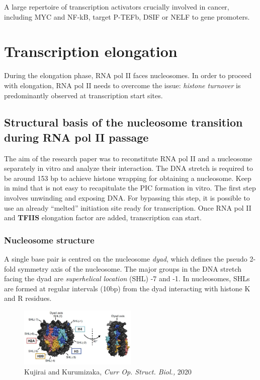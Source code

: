 A large repertoire of transcription activators crucially involved in cancer, including MYC and NF-kB, target P-TEFb, DSIF or NELF to gene promoters.

\section{Transcription elongation}

During the elongation phase, RNA pol II faces nucleosomes. In order to proceed with elongation, RNA pol II needs to overcome the issue: \emph{histone turnover} is predominantly observed at transcription start sites.

\hypertarget{structural-basis-of-the-nucleosome-transition-during-rna-pol-ii-passage---kujirai-et-al-2018}{%
\subsection{Structural basis of the nucleosome transition during RNA pol II passage}\label{structural-basis-of-the-nucleosome-transition-during-rna-pol-ii-passage---kujirai-et-al-2018}}

The aim of the research paper was to reconstitute RNA pol II and a nucleosome separately in vitro and analyze their interaction. The DNA stretch is required to be around 153 bp to achieve histone wrapping for obtaining a nucleosome. Keep in mind that is not easy to recapitulate the PIC formation in vitro. The first step involves unwinding and exposing DNA. For bypassing this step, it is possible to use an already ``melted'' initiation site ready for transcription. Once RNA pol II and \textbf{TFIIS} elongation factor are added, transcription can start.

\hypertarget{nucleosome-structure}{%
\subsubsection{Nucleosome structure}\label{nucleosome-structure}}

A single base pair is centred on the nucleosome \emph{dyad}, which defines the pseudo 2-fold symmetry axis of the nucleosome. The major groups in the DNA stretch facing the dyad are \emph{superhelical location} (SHL) -7 and -1. In nucleosomes, SHLs are formed at regular intervals (10bp) from the dyad interacting with histone K and R residues.

\begin{figure}
\centering
\includegraphics[width=0.5\textwidth]{../_resources/Screenshot_2022-10-05_at_22-41-07.png}
\caption{Kujirai and Kurumizaka, \emph{Curr Op. Struct. Biol.,} 2020}
\end{figure}


